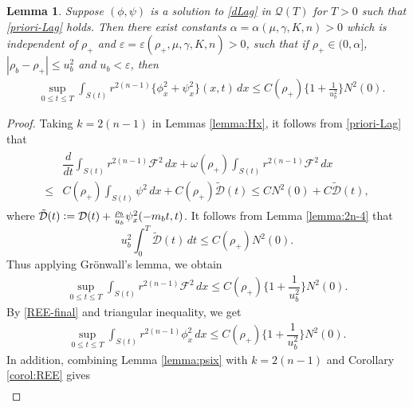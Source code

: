 \documentclass[a4paper,12pt,draft]{article}
\newtheorem{lemma}[theorem]{Lemma}
\theoremstyle{remark}
\def\ep{\varepsilon}
\def\mD{\mathcal{D}}
\def\mF{\mathcal{F}}
\def\mQ{\mathcal{Q}}
\begin{document}
\begin{lemma}
    Suppose $(\phi,\psi)$ is a solution to \eqref{dLag} in $\mQ(T)$ for $T>0$ such that \eqref{priori-Lag} holds. Then there exist constants $\alpha=\alpha(\mu,\gamma,K,n)>0$ which is independent of $\rho_+$ and $\ep=\ep(\rho_+,\mu,\gamma,K,n)>0$, such that if $\rho_+\in (0,\alpha]$, $|\rho_b-\rho_+|\le u_b^2$ and $u_b< \ep$, then
    \begin{align*}
         & \sup\limits_{0 \le t\le T}\int_{S(t)}\!\!  r^{2(n-1)} \big\{  \phi_x^2 + \psi_{x}^2 \big\}(x,t) \, d x \le C(\rho_{+}) \Big\{1+ \frac{1}{u_b^2}\Big\}  N^2(0).
    \end{align*}
\end{lemma}
\begin{proof}
Taking $k=2(n-1)$ in Lemmas \ref{lemma:Hx}, it follows from \eqref{priori-Lag} that
\begin{gather*}
    \begin{aligned}
        &\dfrac{d }{d t} \int_{S(t)}\!\! r^{2(n-1)} \mF^2\, d x + \omega(\rho_{+})\int_{S(t)}\!\! r^{2(n-1)}\mF^2 \, d x\\ 
        \le& C(\rho_+)\int_{S(t)}\!\!\psi^2\, dx + C(\rho_+)\tilde{\mD}(t) \le C N^2(0) + C\tilde{\mD}(t), 
    \end{aligned} 
\end{gather*}
where $\tilde{\mD}(t) \vcentcolon= \mD(t) + \frac{\rho_b}{u_b} \psi_x^2(-m_b t,t)$. It follows from Lemma \ref{lemma:2n-4} that 
\begin{equation*}
    u_b^2 \int_{0}^T \! \tilde{\mD}(t)\, d t \le C(\rho_{+}) N^2(0).
\end{equation*}
Thus applying Gr\"onwall's lemma, we obtain
\begin{align*}
    \sup\limits_{0\le t\le T}\int_{S(t)}\!\! r^{2(n-1)} \mF^2\, dx \le C(\rho_{+}) \Big\{ 1 + \dfrac{1}{u_b^2}  \Big\} N^2(0). 
\end{align*}
By \eqref{REE-final} and triangular inequality, we get
\begin{align*}
    \sup\limits_{0\le t\le T}\int_{S(t)}\!\! r^{2(n-1)} \phi_x^2\, dx \le C(\rho_+) \Big\{ 1 + \dfrac{1}{u_b^2}  \Big\} N^2(0).
\end{align*}
In addition, combining Lemma \ref{lemma:psix} with $k=2(n-1)$ and Corollary \ref{corol:REE} gives
\begin{align*}

\end{align*}
\end{proof}
\end{document}
